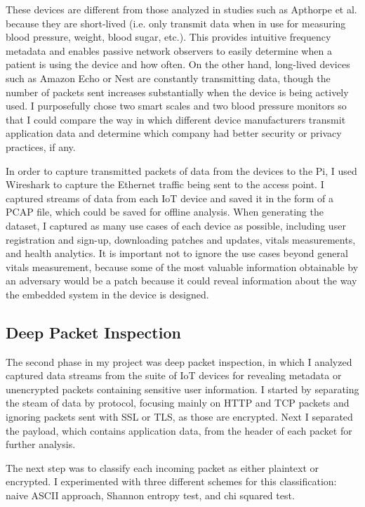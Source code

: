 These devices are different from those analyzed in studies such as Apthorpe et al. because they are short-lived (i.e. only transmit data when in use for measuring blood pressure, weight, blood sugar, etc.). This provides intuitive frequency metadata and enables passive network observers to easily determine when a patient is using the device and how often. On the other hand, long-lived devices such as Amazon Echo or Nest are constantly transmitting data, though the number of packets sent increases substantially when the device is being actively used. I purposefully chose two smart scales and two blood pressure monitors so that I could compare the way in which different device manufacturers transmit application data and determine which company had better security or privacy practices, if any. 

In order to capture transmitted packets of data from the devices to the Pi, I used Wireshark to capture the Ethernet traffic being sent to the access point. I captured streams of data from each IoT device and saved it in the form of a PCAP file, which could be saved for offline analysis. When generating the dataset, I captured as many use cases of each device as possible, including user registration and sign-up, downloading patches and updates, vitals measurements, and health analytics. It is important not to ignore the use cases beyond general vitals measurement, because some of the most valuable information obtainable by an adversary would be a patch because it could reveal information about the way the embedded system in the device is designed. 

\subsection{Deep Packet Inspection}

The second phase in my project was deep packet inspection, in which I analyzed captured data streams from the suite of IoT devices for revealing metadata or unencrypted packets containing sensitive user information. I started by separating the steam of data by protocol, focusing mainly on HTTP and TCP packets and ignoring packets sent with SSL or TLS, as those are encrypted. Next I separated the payload, which contains application data, from the header of each packet for further analysis. 

The next step was to classify each incoming packet as either plaintext or encrypted. I experimented with three different schemes for this classification: naive ASCII approach, Shannon entropy test, and chi squared test. 

